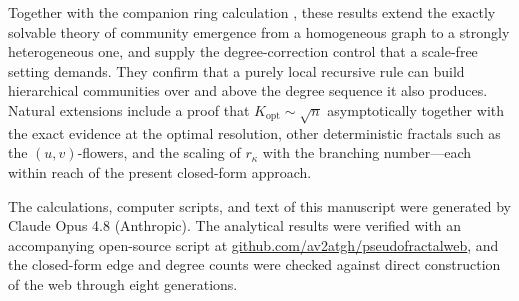\documentclass[aps,pre,twocolumn,superscriptaddress,floatfix,nofootinbib]{revtex4-2}
\begin{document}
Together with the companion ring calculation \cite{vazquez2026ringwantsbroken}, these results extend the exactly
solvable theory of community emergence from a homogeneous graph to a strongly
heterogeneous one, and supply the degree-correction control that a scale-free
setting demands. They confirm that a purely local recursive rule can build
hierarchical communities over and above the degree sequence it also produces.
Natural extensions include a proof that $K_{\mathrm{opt}}\sim\sqrt{n}$
asymptotically together with the exact evidence at the optimal resolution, other
deterministic fractals such as the $(u,v)$-flowers, and the scaling of
$r_\kappa$ with the branching number---each within reach of the present
closed-form approach.

\begin{acknowledgments}
The calculations, computer scripts, and text of this manuscript were generated
by Claude Opus 4.8 (Anthropic). The analytical results were verified with an
accompanying open-source script at 
\href{https://github.com/av2atgh/pseudofractalweb}{github.com/av2atgh/pseudofractalweb},
and the closed-form edge and degree counts
were checked against direct construction of the web through eight generations.
\end{acknowledgments}


%

\end{document}
